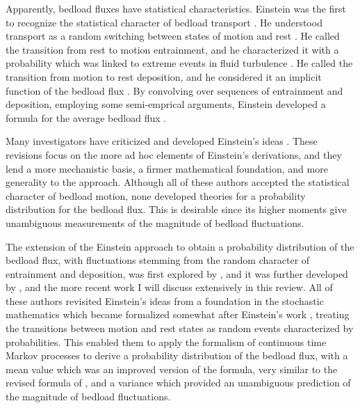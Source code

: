 Apparently, bedload fluxes have statistical characteristics.
Einstein was the first to recognize the statistical character of bedload transport \citep{Einstein1937}. 
He understood transport as a random switching between states of motion and rest \citep{Einstein1942, Einstein1950}. 
He called the transition from rest to motion entrainment, and he characterized it with a probability which was linked to extreme events in fluid turbulence \citep{Einstein1949, Einstein1950}. 
He called the transition from motion to rest deposition, and he considered it an implicit function of the bedload flux \citep{Einstein1942, Einstein1950}. 
By convolving over sequences of entrainment and deposition, employing some semi-emprical arguments, Einstein developed a formula for the average bedload flux \citep{Einstein1950}. 

Many investigators have criticized and developed Einstein's ideas \citep{Paintal1971, Yalin1972, Shen1980, Lisle1998, Papanicolaou2002, Sun2000, Ancey2006, Armanini2015}. 
These revisions focus on the more ad hoc elements of Einstein's derivations, and they lend a more mechanistic basis, a firmer mathematical foundation, and more generality to the approach. 
Although all of these authors accepted the statistical character of bedload motion, none developed theories for a probability distribution for the bedload flux. 
This is desirable since its higher moments give unambiguous measurements of the magnitude of bedload fluctuations. 

The extension of the Einstein approach to obtain a probability distribution of the bedload flux, with fluctuations stemming from the random character of entrainment and deposition, was first explored by \citet{Lisle1998, Sun2000}, and it was further developed by \citet{Ancey2006}, and the more recent work I will discuss extensively in this review.   
All of these authors revisited Einstein's ideas from a foundation in the stochastic mathematics which became formalized somewhat after Einstein's work \citep[e.g.][]{Cox1965}, treating the transitions between motion and rest states as random events characterized by probabilities. 
This enabled them to apply the formalism of continuous time Markov processes to derive a probability distribution of the bedload flux, with a mean value which was an improved version of the \citet{Einstein1950} formula, very similar to the revised formula of \citet{Yalin1972}, and a variance which provided an unambiguous prediction of the magnitude of bedload fluctuations. 


